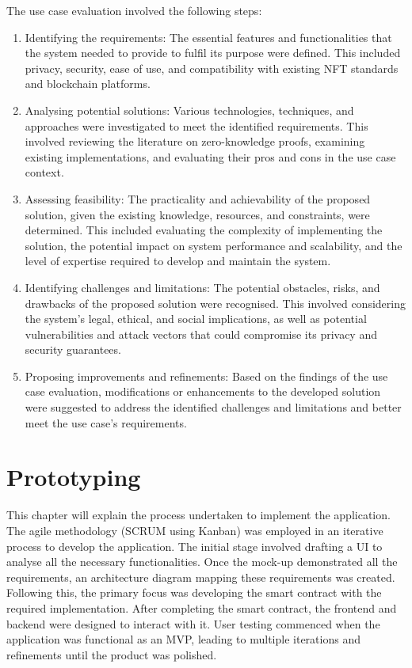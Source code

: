 The use case evaluation involved the following steps:
\begin{enumerate}
    \item Identifying the requirements: The essential features and functionalities that the system needed to provide to fulfil its purpose were defined. This included privacy, security, ease of use, and compatibility with existing NFT standards and blockchain platforms.
    \item Analysing potential solutions: Various technologies, techniques, and approaches were investigated to meet the identified requirements. This involved reviewing the literature on zero-knowledge proofs, examining existing implementations, and evaluating their pros and cons in the use case context.
    \item Assessing feasibility: The practicality and achievability of the proposed solution, given the existing knowledge, resources, and constraints, were determined. This included evaluating the complexity of implementing the solution, the potential impact on system performance and scalability, and the level of expertise required to develop and maintain the system.
    \item Identifying challenges and limitations: The potential obstacles, risks, and drawbacks of the proposed solution were recognised. This involved considering the system's legal, ethical, and social implications, as well as potential vulnerabilities and attack vectors that could compromise its privacy and security guarantees.
    \item Proposing improvements and refinements: Based on the findings of the use case evaluation, modifications or enhancements to the developed solution were suggested to address the identified challenges and limitations and better meet the use case's requirements.
\end{enumerate}

\section{Prototyping}
This chapter will explain the process undertaken to implement the application. The agile methodology (SCRUM using Kanban) was employed in an iterative process to develop the application. The initial stage involved drafting a UI to analyse all the necessary functionalities. Once the mock-up demonstrated all the requirements, an architecture diagram mapping these requirements was created. Following this, the primary focus was developing the smart contract with the required implementation. After completing the smart contract, the frontend and backend were designed to interact with it. User testing commenced when the application was functional as an MVP, leading to multiple iterations and refinements until the product was polished.


